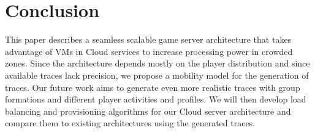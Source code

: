 \documentclass[conference]{IEEEtran}
\begin{document}
\section{Conclusion}

This paper describes a seamless scalable game server architecture that takes advantage of VMs in Cloud services to increase processing power in crowded zones. Since the architecture depends mostly on the player distribution and since available traces lack precision, we propose a mobility model for the generation of traces. Our future work aims to generate even more realistic traces with group formations and different player activities and profiles. We will then develop load balancing and provisioning algorithms for our Cloud server architecture and compare them to existing architectures using the generated traces.



\end{document}
